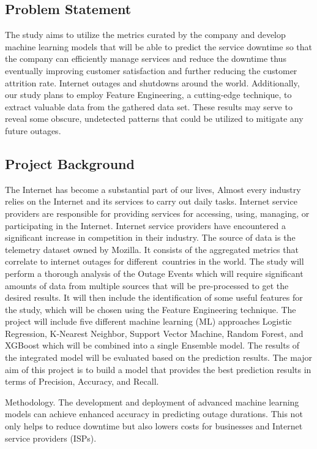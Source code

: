\subsection {Problem Statement}
The study aims to utilize the metrics curated by the company and develop machine learning models that will be able to predict the service downtime so that the company can efficiently manage services and reduce the downtime thus eventually improving customer satisfaction and further reducing the customer attrition rate. Internet outages and shutdowns around the world. Additionally, our study plans to employ Feature Engineering, a cutting-edge technique, to extract valuable data from the gathered data set. These results may serve to reveal some obscure, undetected patterns that could be utilized to mitigate any future outages.

\subsection {Project Background}
The Internet has become a substantial part of our lives, Almost every industry relies on the Internet and its services to carry out daily tasks. Internet service providers are responsible for providing services for accessing, using, managing, or participating in the Internet. Internet service providers have encountered a significant increase in competition in their industry. The source of data is the telemetry dataset owned by Mozilla. It consists of the aggregated metrics that correlate to internet outages for different countries in the world. 
The study will perform a thorough analysis of the Outage Events which will require significant amounts of data from multiple sources that will be pre-processed to get the desired results. It will then include the identification of some useful features for the study, which will be chosen using the Feature Engineering technique. The project will include five different machine learning (ML) approaches Logistic Regression, K-Nearest Neighbor, Support Vector Machine, Random Forest, and XGBoost which will be combined into a single Ensemble model. The results of the integrated model will be evaluated based on the prediction results. The major aim of this project is to build a model that provides the best prediction results in terms of Precision, Accuracy, and Recall.

Methodology. The development and deployment of advanced machine learning models can achieve enhanced accuracy in predicting outage durations. This not only helps to reduce downtime but also lowers costs for businesses and Internet service providers (ISPs).

